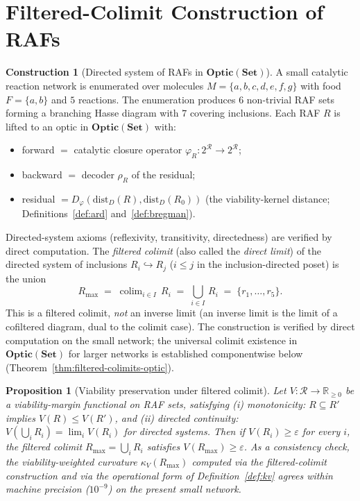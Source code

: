 \documentclass[11pt,a4paper]{article}
\theoremstyle{plain}
\newtheorem{proposition}[theorem]{Proposition}
\theoremstyle{definition}
\newtheorem{construction}[theorem]{Construction}
\theoremstyle{remark}
\newcommand{\kk}{\kappa_{\!V}}
\newcommand{\RR}{\mathbb{R}}
\newcommand{\Optic}{\mathbf{Optic}}
\newcommand{\colim}{\operatorname{colim}}
\begin{document}

\section{Filtered-Colimit Construction of RAFs}\label{sec:invlim}

\begin{construction}[Directed system of RAFs in $\Optic(\mathbf{Set})$]
\label{con:invlim}
A small catalytic reaction network is enumerated over molecules
$M = \{a,b,c,d,e,f,g\}$ with food $F = \{a,b\}$ and $5$ reactions. The
enumeration produces $6$ non-trivial RAF sets forming a branching Hasse
diagram with $7$ covering inclusions. Each RAF $R$ is lifted to an
optic in $\Optic(\mathbf{Set})$ with:
\begin{itemize}[leftmargin=1.2em,itemsep=1pt]
\item forward $=$ catalytic closure operator $\varphi_R:
2^{\mathcal{R}}\to 2^{\mathcal{R}}$;
\item backward $=$ decoder $\rho_R$ of the residual;
\item residual $= D_\varphi(\mathrm{dist}_D(R), \mathrm{dist}_D(R_0))$
(the viability-kernel distance; Definitions~\ref{def:ard}
and~\ref{def:bregman}).
\end{itemize}
Directed-system axioms (reflexivity, transitivity, directedness) are
verified by direct computation. The \emph{filtered colimit} (also
called the \emph{direct limit}) of the directed system of inclusions
$R_i \hookrightarrow R_j$ ($i \leq j$ in the inclusion-directed
poset) is the union
\begin{equation}\label{eq:rmax-colim}
  R_{\max} \;=\; \colim_{i\in I}\, R_i \;=\; \bigcup_{i\in I}\, R_i
  \;=\; \{r_1, \ldots, r_5\}.
\end{equation}
This is a filtered colimit, \emph{not} an inverse limit (an inverse
limit is the limit of a cofiltered diagram, dual to the colimit case).
The construction is verified by direct computation on the small
network; the universal colimit existence in $\Optic(\mathbf{Set})$ for
larger networks is established componentwise below
(Theorem~\ref{thm:filtered-colimits-optic}).
\end{construction}

\begin{proposition}[Viability preservation under filtered colimit]
\label{prop:invlim}
Let $V : \mathcal R \to \RR_{\geq 0}$ be a viability-margin functional
on RAF sets, satisfying (i) \emph{monotonicity}: $R \subseteq R'$
implies $V(R) \leq V(R')$, and (ii) \emph{directed continuity}:
$V(\bigcup_i R_i) = \lim_i V(R_i)$ for directed systems. Then if
$V(R_i) \geq \varepsilon$ for every $i$, the filtered colimit
$R_{\max} = \bigcup_i R_i$ satisfies $V(R_{\max}) \geq \varepsilon$.
As a consistency check, the viability-weighted curvature
$\kk(R_{\max})$ computed via the filtered-colimit construction and
via the operational form of Definition~\ref{def:kv} agrees within
machine precision ($10^{-9}$) on the present small network.
\end{proposition}
\end{document}
